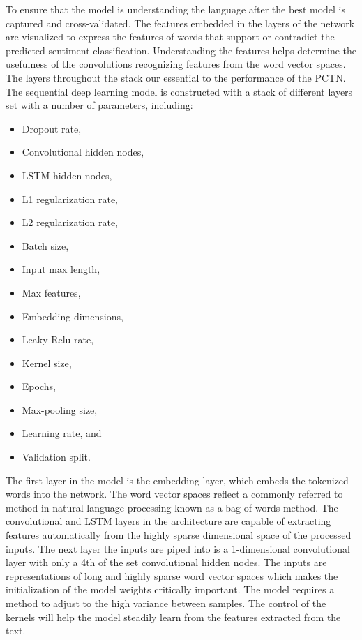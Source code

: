 \documentclass[conference,final,]{IEEEtran}
\providecommand{\tightlist}{%
  \setlength{\itemsep}{0pt}\setlength{\parskip}{0pt}}
\begin{document}
To ensure that the model is understanding the language after the best model is captured and cross-validated.
The features embedded in the layers of the network are visualized to express the features of words that support or contradict the predicted sentiment classification.
Understanding the features helps determine the usefulness of the convolutions recognizing features from the word vector spaces.
The layers throughout the stack our essential to the performance of the PCTN.
The sequential deep learning model is constructed with a stack of different layers set with a number of parameters, including:

\begin{itemize}
\tightlist
\item
  Dropout rate,
\item
  Convolutional hidden nodes,
\item
  LSTM hidden nodes,
\item
  L1 regularization rate,
\item
  L2 regularization rate,
\item
  Batch size,
\item
  Input max length,
\item
  Max features,
\item
  Embedding dimensions,
\item
  Leaky Relu rate,
\item
  Kernel size,
\item
  Epochs,
\item
  Max-pooling size,
\item
  Learning rate, and
\item
  Validation split.
\end{itemize}

The first layer in the model is the embedding layer, which embeds the tokenized words into the network.
The word vector spaces reflect a commonly referred to method in natural language processing known as a bag of words method.
The convolutional and LSTM layers in the architecture are capable of extracting features automatically from the highly sparse dimensional space of the processed inputs.
The next layer the inputs are piped into is a 1-dimensional convolutional layer with only a 4th of the set convolutional hidden nodes.
The inputs are representations of long and highly sparse word vector spaces which makes the initialization of the model weights critically important.
The model requires a method to adjust to the high variance between samples.
The control of the kernels will help the model steadily learn from the features extracted from the text.
\end{document}
